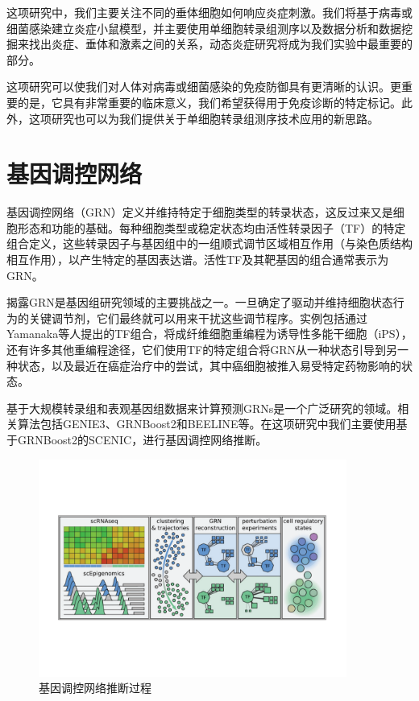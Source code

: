   这项研究中，我们主要关注不同的垂体细胞如何响应炎症刺激。我们将基于病毒或细菌感染建立炎症小鼠模型，并主要使用单细胞转录组测序以及数据分析和数据挖掘来找出炎症、垂体和激素之间的关系，动态炎症研究将成为我们实验中最重要的部分。

  这项研究可以使我们对人体对病毒或细菌感染的免疫防御具有更清晰的认识。更重要的是，它具有非常重要的临床意义，我们希望获得用于免疫诊断的特定标记。此外，这项研究也可以为我们提供关于单细胞转录组测序技术应用的新思路。

\section{基因调控网络}
  基因调控网络（GRN）定义并维持特定于细胞类型的转录状态，这反过来又是细胞形态和功能的基础。每种细胞类型或稳定状态均由活性转录因子（TF）的特定组合定义，这些转录因子与基因组中的一组顺式调节区域相互作用（与染色质结构相互作用），以产生特定的基因表达谱\cite{fiers2018mapping,arendt2016origin}。活性TF及其靶基因的组合通常表示为GRN。

  揭露GRN是基因组研究领域的主要挑战之一。一旦确定了驱动并维持细胞状态行为的关键调节剂，它们最终就可以用来干扰这些调节程序。实例包括通过Yamanaka等人\cite{takahashi2006induction}提出的TF组合，将成纤维细胞重编程为诱导性多能干细胞（iPS），还有许多其他重编程途径，它们使用TF的特定组合将GRN从一种状态引导到另一种状态\cite{marro2011direct,ieda2010direct}，以及最近在癌症治疗中的尝试，其中癌细胞被推入易受特定药物影响的状态\cite{creixell2012navigating,wouters2017decoding}。

  基于大规模转录组和表观基因组数据来计算预测GRNs是一个广泛研究的领域。相关算法包括GENIE3\cite{huynh2010inferring}、GRNBoost2\cite{moerman2019grnboost2}和BEELINE\cite{pratapa2020benchmarking}等。在这项研究中我们主要使用基于GRNBoost2的SCENIC\cite{aibar2017scenic,van2020scalable}，进行基因调控网络推断。

\begin{figure}[!htb]
  \centering
  \includegraphics[width=0.9\textwidth]{figs/scgrn-infer.pdf}
  \caption{基因调控网络推断过程}
  \label{fig:scgrn-infer}
\end{figure}

